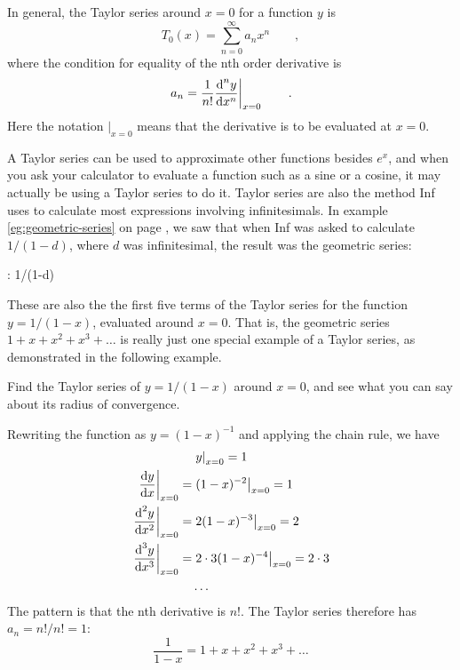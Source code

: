 In general, the Taylor series
around $x=0$ for a function $y$ is
\begin{equation*}
  T_0(x) = \sum_{n=0}^\infty a_n x^n \qquad ,
\end{equation*}
where the condition for equality of the nth order derivative is
\begin{equation*}
  \left. a_n = \frac{1}{n!}\frac{\textup{d}^n y}{\textup{d} x^n}\right|_{x=0} \qquad .
\end{equation*}
Here the notation $\left.\right|_{x=0}$ means that the derivative is to be evaluated at $x=0$.

A Taylor series can be used to approximate other functions besides $e^x$, and when you ask your calculator to evaluate a
function such as a sine or a cosine, it may actually be using a Taylor series to do it.
Taylor series are also the method Inf uses to calculate most expressions involving infinitesimals. In example
\ref{eg:geometric-series} on page \pageref{eg:geometric-series}, we saw that
when Inf was asked to calculate $1/(1-d)$, where $d$ was infinitesimal, the result was the geometric series:
\begin{Code}
  \ii : 1/(1-d)
\end{Code}
These are also the the first five terms of the Taylor series for the function $y=1/(1-x)$, evaluated around $x=0$.
That is, the geometric series $1+x+x^2+x^3+\ldots$ is really just one special example of a Taylor series, as
demonstrated in the following example.

\begin{eg}\label{eg:taylor-geometric}
\egquestion Find the Taylor series of $y=1/(1-x)$ around $x=0$, and see what you can say about
its radius of convergence.

\eganswer Rewriting the function as $y=(1-x)^{-1}$ and applying the chain rule, we have
\begin{align*}
                                                & \left.y\right|_{x=0} = 1\\
  \left.\frac{\textup{d} y}{\textup{d} x}\right|_{x=0}     =& \left.(1-x)^{-2}\right|_{x=0} = 1\\
  \left.\frac{\textup{d}^2 y}{\textup{d} x^2}\right|_{x=0} =& \left.2(1-x)^{-3}\right|_{x=0} = 2\\
  \left.\frac{\textup{d}^3 y}{\textup{d} x^3}\right|_{x=0} =& \left.2\cdot3(1-x)^{-4}\right|_{x=0} = 2\cdot3\\
                                                & \ldots
\end{align*}
The pattern is that the nth derivative is $n!$. The Taylor series therefore has $a_n=n!/n!=1$:
\begin{equation*}
  \frac{1}{1-x} =  1+x+x^2+x^3+\ldots
\end{equation*}
\end{eg}

